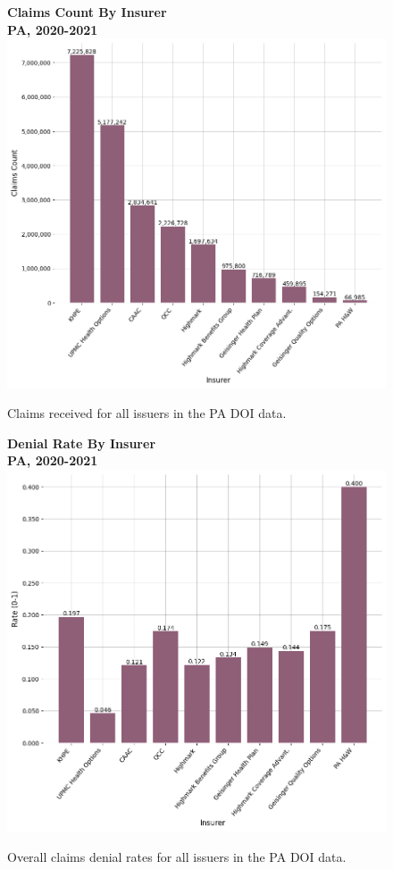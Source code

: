 \documentclass[12pt, a4paper,twoside,parskip=full]{report}
\theoremstyle{plain} %
\theoremstyle{definition} %
\theoremstyle{remark} %
\numberwithin{equation}{chapter}
\begin{document}
		\begin{figure}[h!]
			\centering
			\textbf{Claims Count By Insurer}\\
			\textbf{PA, 2020-2021}\\
			\includegraphics[width=\columnwidth]{images/pa_claims/claims_by_insurer.png}
			\caption{Claims received for all issuers in the PA DOI data.}
			\label{painsurerclaims}
		\end{figure}
		
		\clearpage
		
		
		\begin{figure}[h!]
			\centering
			\textbf{Denial Rate By Insurer}\\
			\textbf{PA, 2020-2021}\\
			\includegraphics[width=\columnwidth]{images/pa_claims/denial_rate_by_insurer.png}
			\caption{Overall claims denial rates for all issuers in the PA DOI data.}
			\label{painsurerdenialrates}
		\end{figure}
		
\end{document}
